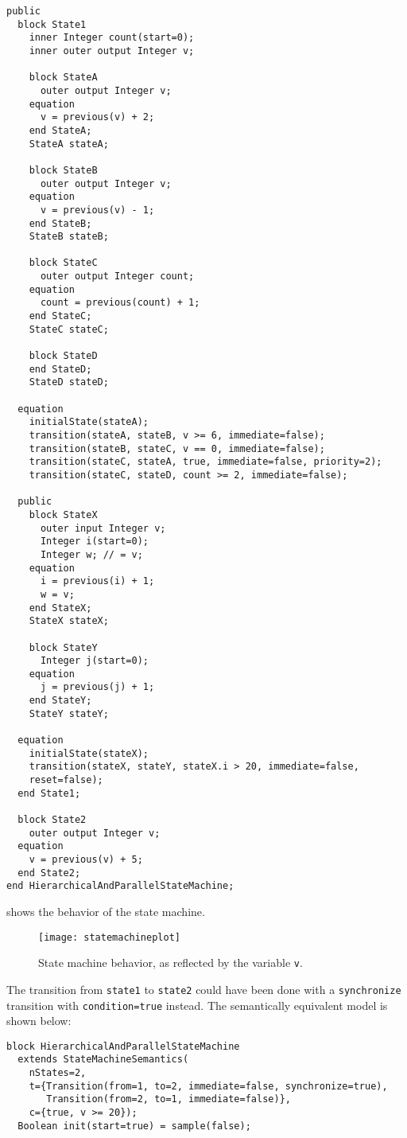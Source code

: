 \begin{example}
\begin{lstlisting}[language=modelica]
public
  block State1
    inner Integer count(start=0);
    inner outer output Integer v;

    block StateA
      outer output Integer v;
    equation
      v = previous(v) + 2;
    end StateA;
    StateA stateA;

    block StateB
      outer output Integer v;
    equation
      v = previous(v) - 1;
    end StateB;
    StateB stateB;

    block StateC
      outer output Integer count;
    equation
      count = previous(count) + 1;
    end StateC;
    StateC stateC;

    block StateD
    end StateD;
    StateD stateD;

  equation
    initialState(stateA);
    transition(stateA, stateB, v >= 6, immediate=false);
    transition(stateB, stateC, v == 0, immediate=false);
    transition(stateC, stateA, true, immediate=false, priority=2);
    transition(stateC, stateD, count >= 2, immediate=false);

  public
    block StateX
      outer input Integer v;
      Integer i(start=0);
      Integer w; // = v;
    equation
      i = previous(i) + 1;
      w = v;
    end StateX;
    StateX stateX;

    block StateY
      Integer j(start=0);
    equation
      j = previous(j) + 1;
    end StateY;
    StateY stateY;

  equation
    initialState(stateX);
    transition(stateX, stateY, stateX.i > 20, immediate=false,
    reset=false);
  end State1;

  block State2
    outer output Integer v;
  equation
    v = previous(v) + 5;
  end State2;
end HierarchicalAndParallelStateMachine;
\end{lstlisting}

 shows the behavior of the state machine.
\begin{figure}[H]
  \begin{center}
    \texttt{[image: statemachineplot]}
  \end{center}
  \caption{State machine behavior, as reflected by the variable \lstinline!v!.}
  \label{fig:state-machine-behavior}
\end{figure}

The transition from \lstinline!state1! to \lstinline!state2! could have been done with a
\lstinline!synchronize! transition with \lstinline!condition=true! instead. The semantically
equivalent model is shown below:
\begin{lstlisting}[language=modelica]
block HierarchicalAndParallelStateMachine
  extends StateMachineSemantics(
    nStates=2,
    t={Transition(from=1, to=2, immediate=false, synchronize=true),
       Transition(from=2, to=1, immediate=false)},
    c={true, v >= 20});
  Boolean init(start=true) = sample(false);


\end{lstlisting}
\end{example}
